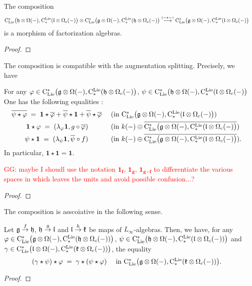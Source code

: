 \documentclass[11pt]{amsart}
\numberwithin{equation}{section}
\def\greg{\textcolor{red}{GG: }\textcolor{red}}
\begin{document}
\begin{lmm}\label{L:compisfacmap} The composition $${\rm C}_{\rm Lie}^*\big(\mathfrak h \otimes \Omega(-), {\rm C}^{\rm Lie}_*(\mathfrak l \otimes \Omega_c(-)  \big) \otimes 
{\rm C}_{\rm Lie}^*\big(\mathfrak g \otimes \Omega(-), {\rm C}^{\rm Lie}_*(\mathfrak h \otimes \Omega_c(-)  \big)
\stackrel{(-\star-)}\longrightarrow 
{\rm C}_{\rm Lie}^*\big(\mathfrak g \otimes \Omega(-), {\rm C}^{\rm Lie}_*(\mathfrak l \otimes \Omega_c(-)  \big)
$$
 is a morphism of factorization algebras.
\end{lmm}
\begin{proof}
 
\end{proof}
The composition is compatible with the augmentation splitting. Precisely, we have
\begin{lmm}\label{L:compisaugmented} For any $\varphi \in {\rm C}_{\rm Lie}^*\big(\mathfrak g \otimes \Omega(-), {\rm C}^{\rm Lie}_*(\mathfrak h \otimes \Omega_c(-)  \big)$,
$\psi \in {\rm C}_{\rm Lie}^*\big(\mathfrak h \otimes \Omega(-), {\rm C}^{\rm Lie}_*(\mathfrak l \otimes \Omega_c(-)  \big)$
 One has the following equalities  :
 \begin{align}
  \overline{\psi\star \varphi} \;= \;\mathbf{1}\star \overline{\varphi} +\overline{\psi}\star \mathbf{1} +\overline{\psi}\star \overline{\varphi} 
  & \quad\mbox{ (in  ${\rm C}_{\rm Lie}^*\big(\mathfrak g \otimes \Omega(-), {\rm C}^{\rm Lie}_*(\mathfrak l \otimes \Omega_c(-)  \big) $)}\\
 \mathbf{1}\star \varphi \;=\;  (\lambda_\varphi \mathbf{1}, g\circ \overline{\varphi})\qquad
  &\quad\mbox{ (in  $k(-)  \oplus \overline{{\rm C}_{\rm Lie}^*\big(\mathfrak g \otimes \Omega(-), {\rm C}^{\rm Lie}_*(\mathfrak l \otimes \Omega_c(-)  \big)}$)}\\
  \psi \star \mathbf{1}\;=\; (\lambda_\psi \mathbf{1}, \overline{\psi} \circ f) \qquad
  &\quad\mbox{ (in  $k(-)  \oplus \overline{{\rm C}_{\rm Lie}^*\big(\mathfrak g \otimes \Omega(-), {\rm C}^{\rm Lie}_*(\mathfrak l \otimes \Omega_c(-)  \big)}$).}
 \end{align}
 In particular, $\mathbf{1} \star \mathbf{1} =\mathbf{1}$.
\end{lmm}
\greg{maybe I shoudl use the notation $\mathbf{1}_{\mathbf{f}}$, $\mathbf{1}_{\mathbf{g}}$, $\mathbf{1}_{\mathbf{g\circ f}}$ to differentiate 
the various spaces in which leaves the units and avoid possible confusion...?}
\begin{proof}
 
\end{proof}
The composition is asscoiative in the following sense.
\begin{lmm}\label{L:compisassociative} Let $\mathfrak g \stackrel{f}\to \mathfrak h$, $\mathfrak h \stackrel{g}\to \mathfrak l$ and $\mathfrak l \stackrel{h}\to \mathfrak{k}$ be maps of $L_\infty$-algebras.
 Then, we have, for any $\varphi \in {\rm C}_{\rm Lie}^*\big(\mathfrak g\otimes \Omega(-), {\rm C}^{\rm Lie}_*(\mathfrak h \otimes \Omega_c(-)) \big)$, 
  $\psi \in {\rm C}_{\rm Lie}^*\big(\mathfrak h\otimes \Omega(-), {\rm C}^{\rm Lie}_*(\mathfrak l \otimes \Omega_c(-)) \big)$ and  
  $\gamma \in {\rm C}_{\rm Lie}^*\big(\mathfrak l\otimes \Omega(-), {\rm C}^{\rm Lie}_*(\mathfrak{k} \otimes \Omega_c(-)) \big)$, the equality 
  \[ (\gamma\star \psi)\star \varphi \;=\; \gamma\star (\psi \star \varphi) \quad \mbox{ in 
  ${\rm C}_{\rm Lie}^*\big(\mathfrak g\otimes \Omega(-), {\rm C}^{\rm Lie}_*(\mathfrak{k} \otimes \Omega_c(-)) \big)$.}  \]
\end{lmm}
\begin{proof}
 
\end{proof}
\end{document}
